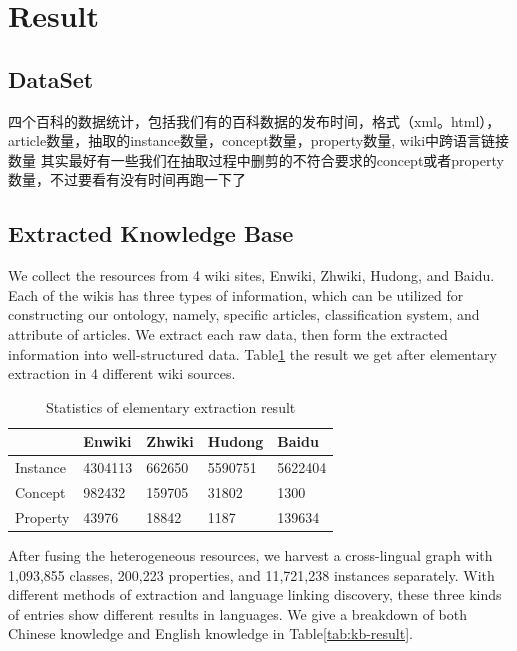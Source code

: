 \documentclass[runningheads,a4paper]{llncs}
\begin{document}
\section{Result}
\label{sec:result}
\subsection{DataSet}
四个百科的数据统计，包括我们有的百科数据的发布时间，格式（xml。html），article数量，抽取的instance数量，concept数量，property数量, wiki中跨语言链接数量
其实最好有一些我们在抽取过程中删剪的不符合要求的concept或者property数量，不过要看有没有时间再跑一下了
\subsection{Extracted Knowledge Base}
We collect the resources from 4 wiki sites, Enwiki, Zhwiki, Hudong, and Baidu. Each of the wikis has three types of information, which can be utilized for constructing our ontology, namely, specific articles, classification system, and attribute of articles. We extract each raw data, then form the extracted information into well-structured data. Table\ref{tab:extract-result} the result we get after elementary extraction in 4 different wiki sources.

\begin{table}[h]
\small
\centering
\caption{Statistics of elementary extraction result}
\label{tab:extract-result}
    \begin{tabular}{|l|l|l|l|l|}
        \hline
                 & Enwiki  & Zhwiki & Hudong  & Baidu   \\ \hline
        Instance & 4304113 & 662650 & 5590751 & 5622404 \\ \hline
        Concept  & 982432  & 159705 & 31802   & 1300    \\ \hline
        Property & 43976   & 18842  & 1187    & 139634  \\ \hline
    \end{tabular}
\end{table}

After fusing the heterogeneous resources, we harvest a cross-lingual graph with 1,093,855 classes, 200,223 properties, and 11,721,238 instances separately. With different methods of extraction and language linking discovery, these three kinds of entries show different results in languages. We give a breakdown of both Chinese knowledge and English knowledge in Table\ref{tab:kb-result}.
\end{document}
